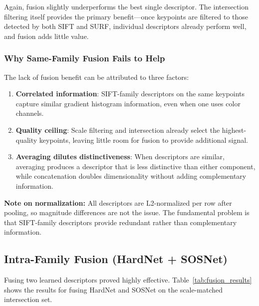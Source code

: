 Again, fusion slightly underperforms the best single descriptor. The intersection filtering itself provides the primary benefit---once keypoints are filtered to those detected by both SIFT and SURF, individual descriptors already perform well, and fusion adds little value.

\subsubsection{Why Same-Family Fusion Fails to Help}

The lack of fusion benefit can be attributed to three factors:

\begin{enumerate}
    \item \textbf{Correlated information}: SIFT-family descriptors on the same keypoints capture similar gradient histogram information, even when one uses color channels.

    \item \textbf{Quality ceiling}: Scale filtering and intersection already select the highest-quality keypoints, leaving little room for fusion to provide additional signal.

    \item \textbf{Averaging dilutes distinctiveness}: When descriptors are similar, averaging produces a descriptor that is less distinctive than either component, while concatenation doubles dimensionality without adding complementary information.
\end{enumerate}

\textbf{Note on normalization:} All descriptors are L2-normalized per row after pooling, so magnitude differences are not the issue. The fundamental problem is that SIFT-family descriptors provide redundant rather than complementary information.

\subsection{Intra-Family Fusion (HardNet + SOSNet)}

Fusing two learned descriptors proved highly effective. Table~\ref{tab:fusion_results} shows the results for fusing HardNet and SOSNet on the scale-matched intersection set.

